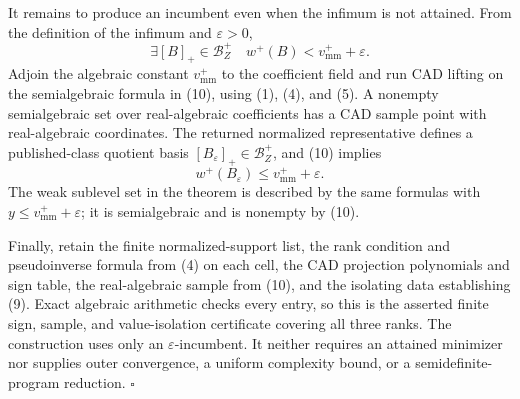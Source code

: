 It remains to produce an incumbent even when the infimum is not attained.  From the definition of the infimum and \(\varepsilon>0\),
\[
 \exists [B]_+\in\mathcal B_Z^+
 \quad w^+(B)<v_{\mathrm{mm}}^++\varepsilon.
\tag{10}
\]
Adjoin the algebraic constant \(v_{\mathrm{mm}}^+\) to the coefficient field and run CAD lifting on the semialgebraic formula in (10), using (1), (4), and (5).  A nonempty semialgebraic set over real-algebraic coefficients has a CAD sample point with real-algebraic coordinates.  The returned normalized representative defines a published-class quotient basis \([B_\varepsilon]_+\in\mathcal B_Z^+\), and (10) implies
\[
 w^+(B_\varepsilon)\le v_{\mathrm{mm}}^++\varepsilon.
\tag{11}
\]
The weak sublevel set in the theorem is described by the same formulas with \(y\le v_{\mathrm{mm}}^++\varepsilon\); it is semialgebraic and is nonempty by (10).

Finally, retain the finite normalized-support list, the rank condition and pseudoinverse formula from (4) on each cell, the CAD projection polynomials and sign table, the real-algebraic sample from (10), and the isolating data establishing (9).  Exact algebraic arithmetic checks every entry, so this is the asserted finite sign, sample, and value-isolation certificate covering all three ranks.  The construction uses only an \(\varepsilon\)-incumbent.  It neither requires an attained minimizer nor supplies outer convergence, a uniform complexity bound, or a semidefinite-program reduction. \(\square\)